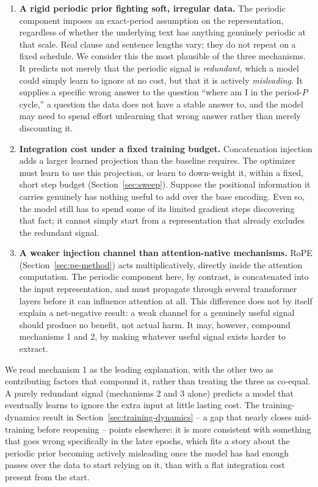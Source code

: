 \documentclass[11pt]{article}
\begin{document}
\begin{enumerate}
\item \textbf{A rigid periodic prior fighting soft, irregular data.} The periodic component imposes an exact-period assumption on the representation, regardless of whether the underlying text has anything genuinely periodic at that scale. Real clause and sentence lengths vary; they do not repeat on a fixed schedule. We consider this the most plausible of the three mechanisms. It predicts not merely that the periodic signal is \emph{redundant}, which a model could simply learn to ignore at no cost, but that it is actively \emph{misleading}. It supplies a specific wrong answer to the question ``where am I in the period-$P$ cycle,'' a question the data does not have a stable answer to, and the model may need to spend effort unlearning that wrong answer rather than merely discounting it.
\item \textbf{Integration cost under a fixed training budget.} Concatenation injection adds a larger learned projection than the baseline requires. The optimizer must learn to use this projection, or learn to down-weight it, within a fixed, short step budget (Section~\ref{sec:sweep}). Suppose the positional information it carries genuinely has nothing useful to add over the base encoding. Even so, the model still has to spend some of its limited gradient steps discovering that fact; it cannot simply start from a representation that already excludes the redundant signal.
\item \textbf{A weaker injection channel than attention-native mechanisms.} RoPE (Section~\ref{sec:pe-method}) acts multiplicatively, directly inside the attention computation. The periodic component here, by contrast, is concatenated into the input representation, and must propagate through several transformer layers before it can influence attention at all. This difference does not by itself explain a net-negative result: a weak channel for a genuinely useful signal should produce no benefit, not actual harm. It may, however, compound mechanisms 1 and 2, by making whatever useful signal exists harder to extract.
\end{enumerate}

We read mechanism 1 as the leading explanation, with the other two as contributing factors that compound it, rather than treating the three as co-equal. A purely redundant signal (mechanisms 2 and 3 alone) predicts a model that eventually learns to ignore the extra input at little lasting cost. The training-dynamics result in Section~\ref{sec:training-dynamics} -- a gap that nearly closes mid-training before reopening -- points elsewhere: it is more consistent with something that goes wrong specifically in the later epochs, which fits a story about the periodic prior becoming actively misleading once the model has had enough passes over the data to start relying on it, than with a flat integration cost present from the start.
\end{document}
